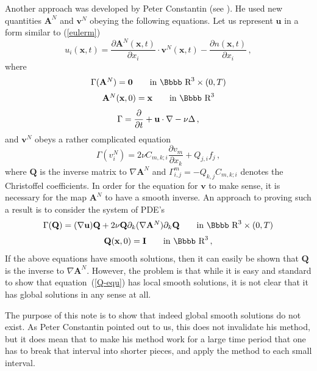 \documentclass[12pt,twoside]{article}
\newcommand{\bA}{\mathbf{A}}
\newcommand {\rdd}{\mbox{\Bbbb R}}
\newcommand {\bnul}{{\mathbf {0}}}
\newcommand {\bv}{{\mathbf{v}}}
\newcommand {\bu}{{\mathbf{u}}}
\newcommand {\bI}{{\mathbf{I}}}
\newcommand {\bx}{{\mathbf{x}}}
\newcommand {\bQ}{{\mathbf{Q}}}
\newcommand {\pder}[2]{\frac {\partial #1}{\partial #2}}
\begin{document}
Another approach was developed by Peter Constantin (see \cite{Co}).  He
used new quantities $\bA^N$ and $\bv^N$ obeying the following equations.
Let us represent $\bu$ in a form similar to 
(\ref{eulerm})
$$
u_i(\bx,t) = \pder{\bA^N(\bx,t)}{x_i} \cdot \bv^N(\bx,t) - \pder{n(\bx,t)}{x_i}\, ,
$$
where 
\begin{equation} \label {0.3}
\begin{array}{c}
\Ga(\bA^N) = \bnul \qquad {\rm in \ } \rdd^3 \times (0,T) \\[6pt]
\bA^N(\bx, 0) = \bx \qquad {\rm in \ } \rdd^3 
\end{array}
\end{equation}
$$
\Ga = \pder{}{t} + \bu\cdot \nabla - \nu \Delta\, ,
$$
and $\bv^N$ obeys a rather complicated equation
$$
\Gamma (v^N_i) = 2 \nu C_{m,k;i} \pder{v_m}{x_k} + Q_{j,i} f_j\, ,
$$
where $\bQ$ is the inverse matrix to $\nabla \bA^N$ and $\Gamma_{i,j}^m =
- Q_{k,j} C_{m,k;i}$ denotes the Christoffel coefficients.  
In order for the equation
for $\bv$ to make sense, it is necessary for the map $\bA^N$ to have a
smooth inverse.  An approach to proving such a result is to consider
the system of PDE's
\begin{equation} \label{Q-equ} %
\begin{array}{c}
\Ga (\bQ) = (\nabla \bu) \bQ + 2\nu \bQ \partial_k (\nabla \bA^N) \partial_k \bQ
\qquad {\rm in \ } \rdd^3 \times (0,T) \\[6pt]
\bQ(\bx,0) = \bI \qquad {\rm in \ } \rdd^3\, ,
\end{array}
\end{equation}
If the above equations have smooth solutions, then it can easily be shown
that $\bQ$ is the inverse to $\nabla \bA^N$.  However, the problem is that
while it is easy and standard to show that equation~(\ref{Q-equ}) has local
smooth solutions, it is not clear that it has global solutions in any
sense at all.

The purpose of this note is to show that indeed global smooth solutions
do not exist.  As Peter Constantin pointed out to us, this does not invalidate
his method, but it does mean that to make his method work for a large
time period that one has to break that
interval into shorter pieces, and apply the method to each small interval.
\end{document}
